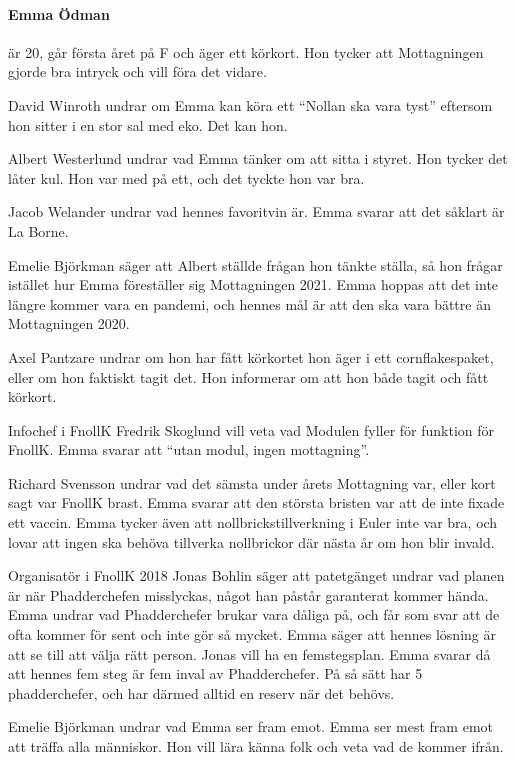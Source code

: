 \documentclass[hidelinks]{sektionsmote}
\begin{document}
\paragraph{Emma Ödman} är 20, går första året på F och äger ett körkort.
Hon tycker att Mottagningen gjorde bra intryck och vill föra det vidare.\par
David Winroth undrar om Emma kan köra ett \enquote{Nollan ska vara tyst} eftersom hon sitter i en stor sal med eko.
Det kan hon.\par
Albert Westerlund undrar vad Emma tänker om att sitta i styret.
Hon tycker det låter kul.
Hon var med på ett, och det tyckte hon var bra.\par
Jacob Welander undrar vad hennes favoritvin är.
Emma svarar att det såklart är La Borne.\par
Emelie Björkman säger att Albert ställde frågan hon tänkte ställa, så hon frågar istället hur Emma föreställer sig Mottagningen 2021.
Emma hoppas att det inte längre kommer vara en pandemi, och hennes mål är att den ska vara bättre än Mottagningen 2020.\par
Axel Pantzare undrar om hon har fått körkortet hon äger i ett cornflakespaket, eller om hon faktiskt tagit det.
Hon informerar om att hon både tagit och fått körkort.\par
Infochef i FnollK Fredrik Skoglund vill veta vad Modulen fyller för funktion för FnollK.
Emma svarar att \enquote{utan modul, ingen mottagning}.\par
Richard Svensson undrar vad det sämsta under årets Mottagning var, eller kort sagt var FnollK brast.
Emma svarar att den största bristen var att de inte fixade ett vaccin.
Emma tycker även att nollbrickstillverkning i Euler inte var bra, och lovar att ingen ska behöva tillverka nollbrickor där nästa år om hon blir invald.\par
Organisatör i FnollK 2018 Jonas Bohlin säger att patetgänget undrar vad planen är när Phadderchefen misslyckas, något han påstår garanterat kommer hända.
Emma undrar vad Phadderchefer brukar vara dåliga på, och får som svar att de ofta kommer för sent och inte gör så mycket.
Emma säger att hennes lösning är att se till att välja rätt person.
Jonas vill ha en femstegsplan.
Emma svarar då att hennes fem steg är fem inval av Phadderchefer.
På så sätt har 5 phadderchefer, och har därmed alltid en reserv när det behövs.\par
Emelie Björkman undrar vad Emma ser fram emot.
Emma ser mest fram emot att träffa alla människor.
Hon vill lära känna folk och veta vad de kommer ifrån.\par
\end{document}
